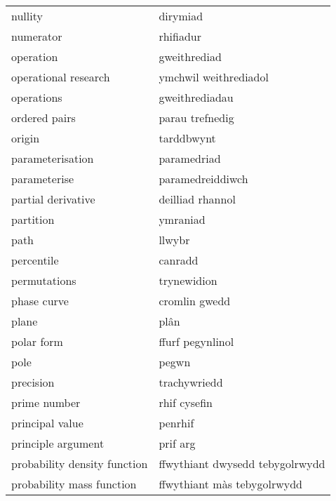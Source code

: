 \begin{supertabular}{p{0.22\textwidth}p{0.22\textwidth}}
                          nullity &                         dirymiad \\
                        numerator &                        rhifiadur \\
                        operation &                     gweithrediad \\
             operational research &            ymchwil weithrediadol \\
                       operations &                   gweithrediadau \\
                    ordered pairs &                  parau trefnedig \\
                           origin &                       tarddbwynt \\
                 parameterisation &                      paramedriad \\
                     parameterise &                 paramedreiddiwch \\
               partial derivative &                 deilliad rhannol \\
                        partition &                         ymraniad \\
                             path &                           llwybr \\
                       percentile &                          canradd \\
                     permutations &                      trynewidion \\
                      phase curve &                    cromlin gwedd \\
                            plane &                             plân \\
                       polar form &                 ffurf pegynlinol \\
                             pole &                            pegwn \\
                        precision &                     trachywriedd \\
                     prime number &                     rhif cysefin \\
                  principal value &                          penrhif \\
               principle argument &                         prif arg \\
     probability density function &  ffwythiant dwysedd tebygolrwydd \\
        probability mass function &      ffwythiant màs tebygolrwydd \\

\end{supertabular}
